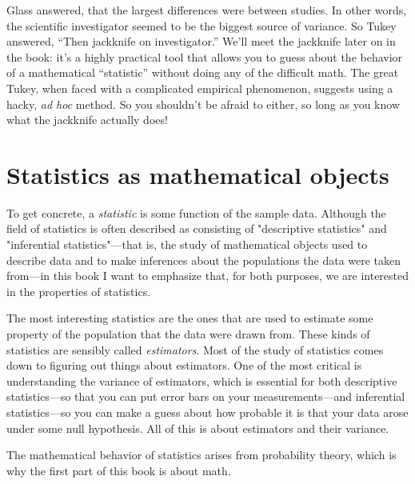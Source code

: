 Glass answered, that the largest differences were between studies. In other
words, the scientific investigator seemed to be the biggest source of
variance. So Tukey answered, ``Then jackknife on investigator.'' We'll meet
the jackknife later on in the book: it's a highly practical tool that allows
you to guess about the behavior of a mathematical ``statistic'' without doing
any of the difficult math. The great Tukey, when faced with a complicated
empirical phenomenon, suggests using a hacky, \emph{ad hoc} method. So you
shouldn't be afraid to either, so long as you know what the jackknife actually
does!

\section{Statistics as mathematical objects}

To get concrete, a \emph{statistic} is some function of the sample data.
Although the field of statistics is often described as consisting of
"descriptive statistics" and "inferential statistics"---that is, the study of
mathematical objects used to describe data and to make inferences about the
populations the data were taken from---in this book I want to emphasize that,
for both purposes, we are interested in the properties of statistics.

The most interesting statistics are the ones that are used to estimate some
property of the population that the data were drawn from. These kinds of statistics are sensibly called
\emph{estimators}. Most of the study of statistics comes down to figuring out things
about estimators. One of the most critical is understanding the variance of
estimators, which is essential for both descriptive statistics---so that you
can put error bars on your measurements---and inferential statistics---so you
can make a guess about how probable it is that your data arose under some null
hypothesis. All of this is about estimators and their variance.

The mathematical behavior of statistics arises from probability theory, which
is why the first part of this book is about math.
